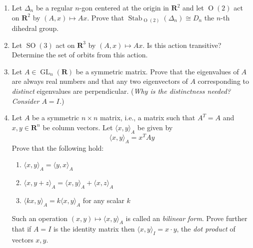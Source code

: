 \documentclass[12pt]{article}
\numberwithin{equation}{subsection}
\theoremstyle{note}
\newcommand{\GL}{\operatorname{GL}}
\newcommand{\Or}{\operatorname{O}}
\newcommand{\SO}{\operatorname{SO}}
\newcommand{\Stab}{\operatorname{Stab}}
\begin{document}
\begin{enumerate}[label=\arabic*.]
Follow up: Does $\SO(4)$ contain the following matrix?  \[\widetilde{R_{\theta,\psi}} = \begin{pmatrix} 0 & 0 & \cos \theta & - \sin\theta  \\
0 & 0 &\sin\theta & \cos\theta  \\
\cos\psi & -\sin\psi & 0 & 0\\
 \sin\psi & \cos\psi & 0 & 0 \end{pmatrix}\]
	
	\item Let $\Delta_n$ be a regular $n$-gon centered at the origin in $\mathbf{R}^2$ and let $\Or(2)$ act on $\mathbf{R}^2$ by $(A,x)\mapsto Ax$. Prove that $\Stab_{\Or(2)}(\Delta_n)\cong D_n$ the $n$-th dihedral group.
	
	\item Let $\SO(3)$ act on $\mathbf{R}^3$ by $(A,x)\mapsto Ax$. Is this action transitive? Determine the set of orbits from this action. 

	\item Let $A\in \GL_n(\mathbf{R})$ be a symmetric matrix. Prove that the eigenvalues of $A$ are always real numbers and that any two eigenvectors of $A$ corresponding to \textit{distinct} eigenvalues are perpendicular. (\textit{Why is the distinctness needed? Consider $A=I$.}) 
	
	\item \label{bilinear-form}Let $A$ be a symmetric $n\times n$ matrix, i.e., a matrix such that $A^T=A$ and $x,y\in \mathbf{R}^n$ be column vectors. Let $\langle x,y\rangle_A$ be given by \[\langle x,y\rangle_A=x^T A y\]
	Prove that the following hold: \begin{enumerate}
		\item $\langle x, y\rangle_A=\langle y,x\rangle_A$
		\item $\langle x, y+z\rangle_A=\langle x, y\rangle_A+\langle x, z\rangle_A$
		\item $\langle kx, y\rangle_A=k\langle x, y\rangle_A$ \quad for any scalar $k$
	\end{enumerate}
	Such an operation $(x,y)\mapsto \langle x,y\rangle_A$ is called an \textit{bilinear form}. Prove further that if $A=I$ is the identity matrix then $\langle x,y\rangle_{I}=x\cdot y$, the \textit{dot product} of vectors $x,y$.

	


\end{enumerate}
\end{document}
